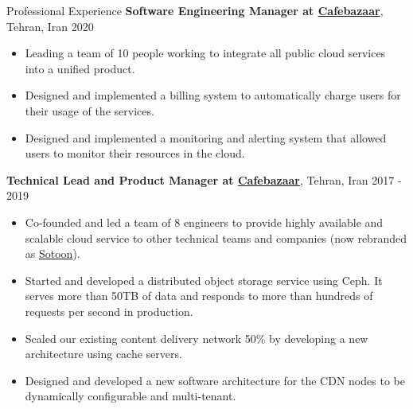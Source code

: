 \documentclass{resume} %
\begin{document}

\begin{rSection}{Professional Experience}
	{\bf Software Engineering Manager at \href{https://cafebazaar.ir/}{Cafebazaar}}, Tehran, Iran \hfill 2020
	\smallskip
	\vspace{-0.5em}
	\begin{itemize}[leftmargin=3mm]
		\setlength{\itemsep}{1pt}
		\setlength{\parskip}{0pt}
		\setlength{\parsep}{0pt}
		\renewcommand\labelitemi{$\cdot$}

		\item Leading a team of 10 people working to integrate all public cloud services into a unified product.
		\item Designed and implemented a billing system to automatically charge users for their usage of the services.
		\item Designed and implemented a monitoring and alerting system that allowed users to monitor their resources in the cloud.
	\end{itemize}
	
	{\bf Technical Lead and Product Manager at \href{https://cafebazaar.ir/}{Cafebazaar}}, Tehran, Iran \hfill 2017 - 2019
	\smallskip
	\vspace{-0.5em}
	\begin{itemize}[leftmargin=3mm]
		\setlength{\itemsep}{1pt}
		\setlength{\parskip}{0pt}
		\setlength{\parsep}{0pt}
		\renewcommand\labelitemi{$\cdot$}

		\item Co-founded and led a team of 8 engineers to provide highly available and scalable cloud service to other technical teams and companies (now rebranded as \href{https://sotoon.ir/}{Sotoon}).
		\item Started and developed a distributed object storage service using Ceph. It serves more than 50TB of data and responds to more than hundreds of requests per second in production.
		\item Scaled our existing content delivery network 50\% by developing a new architecture using cache servers.
		\item Designed and developed a new software architecture for the CDN nodes to be dynamically configurable and multi-tenant.%
	\end{itemize}
	

\end{rSection}
\end{document}
